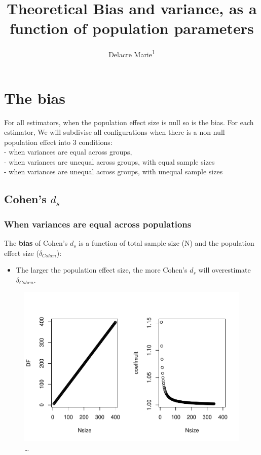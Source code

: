 \documentclass[
  man]{apa6}
\affiliation{
\vspace{0.5cm}
\textsuperscript{1} ULB}
\title{Theoretical Bias and variance, as a function of population parameters}
\author{Delacre Marie\textsuperscript{1}}
\date{}
\providecommand{\tightlist}{%
  \setlength{\itemsep}{0pt}\setlength{\parskip}{0pt}}
\begin{document}
\maketitle

\hypertarget{the-bias}{%
\section{The bias}\label{the-bias}}

For all estimators, when the population effect size is null so is the bias. For each estimator, We will subdivise all configurations when there is a non-null population effect into 3 conditions:\\
- when variances are equal across groups,\\
- when variances are unequal across groups, with equal sample sizes\\
- when variances are unequal across groups, with unequal sample sizes

\hypertarget{cohens-d_s}{%
\subsection{\texorpdfstring{Cohen's \(d_s\)}{Cohen's d\_s}}\label{cohens-d_s}}

\hypertarget{when-variances-are-equal-across-populations}{%
\subsubsection{When variances are equal across populations}\label{when-variances-are-equal-across-populations}}

The \textbf{bias} of Cohen's \(d_s\) is a function of total sample size (N) and the population effect size (\(\delta_{Cohen}\)):

\begin{itemize}
\tightlist
\item
  The larger the population effect size, the more Cohen's \(d_s\) will overestimate \(\delta_{Cohen}\).
\end{itemize}

\begin{figure}
\centering
\includegraphics{Theoretical-Bias-and-variance,-as-a-function-of-population-parameters_files/figure-latex/biascohendNsize2-1.pdf}
\caption{\label{fig:biascohendNsize2}\ldots{}}
\end{figure}
\end{document}
